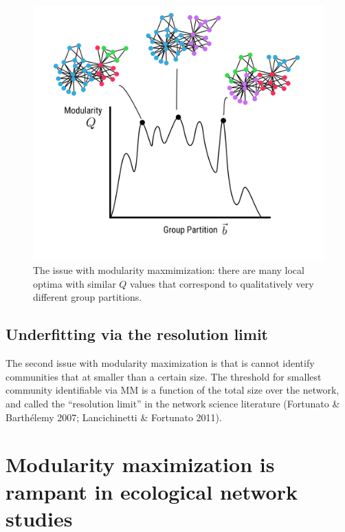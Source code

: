 \documentclass[
]{article}
\begin{document}
\begin{figure}

{\centering \includegraphics{figures/bumpy.png}

}

\caption{\label{fig-modularity-maximization}The issue with modularity
maxmimization: there are many local optima with similar \(Q\) values
that correspond to qualitatively very different group partitions.}

\end{figure}

\hypertarget{underfitting-via-the-resolution-limit}{%
\subsection{Underfitting via the resolution
limit}\label{underfitting-via-the-resolution-limit}}

The second issue with modularity maximization is that is cannot identify
communities that at smaller than a certain size. The threshold for
smallest community identifiable via MM is a function of the total size
over the network, and called the ``resolution limit'' in the network
science literature (Fortunato \& Barthélemy 2007; Lancichinetti \&
Fortunato 2011).

\hypertarget{modularity-maximization-is-rampant-in-ecological-network-studies}{%
\section{Modularity maximization is rampant in ecological network
studies}\label{modularity-maximization-is-rampant-in-ecological-network-studies}}
\end{document}

